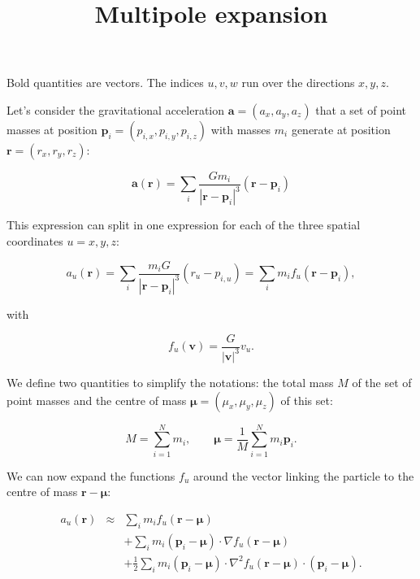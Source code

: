 \documentclass[a4paper,10pt]{article}
\title{Multipole expansion}
\newcommand{\rr}{\mathbf{r}}
\newcommand{\vv}{\mathbf{v}}
\newcommand{\p}[1]{\mathbf{p}_#1}
\newcommand{\acc}{\mathbf{a}}
\newcommand{\muu}{\boldsymbol{\mu}}
\begin{document}
\maketitle

Bold quantities are vectors. The indices $u,v,w$ run over the directions $x,y,z$.

Let's consider the gravitational acceleration $\acc=(a_x,a_y,a_z)$ that a set of point masses at position 
$\p{i}=(p_{i,x}, p_{i,y}, p_{i,z})$ with masses $m_i$ generate at position $\rr=(r_x, r_y, r_z)$:

\begin{equation}
 \acc(\rr) = \sum_i \frac{Gm_i}{|\rr - \p{i}|^3}(\rr - \p{i})
\end{equation}

This expression can split in one expression for each of the three spatial coordinates $u=x,y,z$:

\begin{equation}
 a_u (\rr) = \sum_i \frac{m_i G}{|\rr-\p{i}|^3} ( r_u - p_{i,u}) = \sum_i m_i f_u(\rr - \p{i}),
\end{equation}

with 

\begin{equation}
 f_u (\vv) = \frac{G}{|\vv|^3} v_u.
\end{equation}

We define two quantities to simplify the notations: the total mass $M$ of the set of point masses and the centre of 
mass $\muu=(\mu_x, \mu_y, \mu_z)$ of this set:

\begin{equation}
 M = \sum_{i=1}^N m_i, \qquad \muu = \frac{1}{M} \sum_{i=1}^N m_i\p{i}.
\end{equation}


We can now expand the functions $f_u$ around the vector linking the particle to the centre of mass $\rr-\muu$:

\begin{eqnarray}
 a_u(\rr) &\approx& \sum_i m_i f_u(\rr - \muu) \\
  & & + \sum_i m_i (\p{i}-\muu) \cdot \nabla f_u(\rr - \muu)\\
  & & + \frac{1}{2}\sum_i m_i (\p{i}-\muu)\cdot \nabla^2 f_u(\rr-\muu)\cdot (\p{i} - \muu).
\end{eqnarray}
\end{document}
